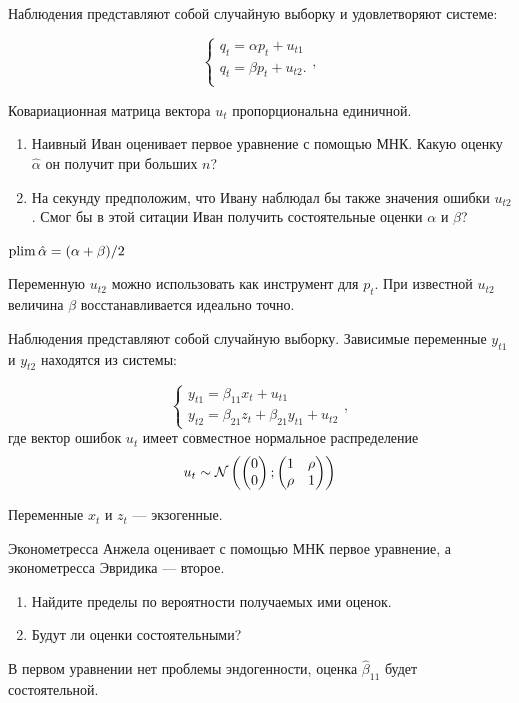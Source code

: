 \begin{problem}

Наблюдения представляют собой случайную выборку и удовлетворяют системе:

  \[
  \begin{cases}
    q_t = \alpha p_t + u_{t1} \\
    q_t = \beta p_t + u_{t2}. \\
  \end{cases},
  \]

  Ковариационная матрица вектора $u_t$ пропорциональна единичной.


  \begin{enumerate}
    \item Наивный Иван оценивает первое уравнение с помощью МНК. Какую оценку $\hat\alpha$ он получит при больших $n$?
    \item На секунду предположим, что Ивану наблюдал бы также значения ошибки $u_{t2}$. 
    Смог бы в этой ситации Иван получить состоятельные оценки $\alpha$ и $\beta$?
  \end{enumerate}


\begin{sol}
$\operatorname*{plim} \hat \alpha = (\alpha + \beta)/2$

Переменную $u_{t2}$ можно использовать как инструмент для $p_t$. 
При известной $u_{t2}$ величина $\beta$ восстанавливается идеально точно. 
\end{sol}
\end{problem}




\begin{problem}
Наблюдения представляют собой случайную выборку. Зависимые переменные $y_{t1}$ и $y_{t2}$ находятся из системы:

\[
\begin{cases}
y_{t1} = \beta_{11} x_t + u_{t1} \\
y_{t2} = \beta_{21} z_t + \beta_{21} y_{t1} + u_{t2}
\end{cases},
\]
где вектор ошибок $u_t$ имеет совместное нормальное распределение
\[
u_t \sim \mathcal{N}\left(
\begin{pmatrix}
  0 \\
  0
\end{pmatrix};
\begin{pmatrix}
  1 & \rho \\
  \rho & 1
\end{pmatrix}
\right)
\]

Переменные $x_t$ и $z_t$ — экзогенные. 

Эконометресса Анжела оценивает с помощью МНК первое уравнение, а эконометресса Эвридика — второе.
\begin{enumerate}
\item Найдите пределы по вероятности получаемых ими оценок.
\item Будут ли оценки состоятельными?
\end{enumerate}

\begin{sol}
  В первом уравнении нет проблемы эндогенности, оценка $\hat \beta_{11}$ будет состоятельной. 
\end{sol}
\end{problem}
  


